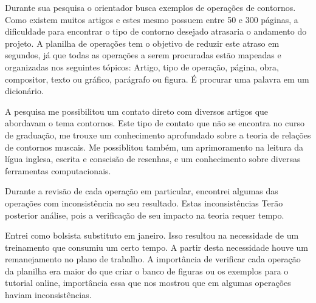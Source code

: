 \documentclass[11pt]{article}
\begin{document}
Durante sua pesquisa o orientador busca exemplos de operações de contornos. Como existem
muitos artigos e estes mesmo possuem entre 50 e 300 páginas, a dificuldade para encontrar
o tipo de contorno desejado atrasaria o andamento do projeto. A planilha de operações tem o
objetivo de reduzir este atraso em segundos, já que todas as operações a serem procuradas
estão mapeadas e organizadas nos seguintes tópicos: Artigo, tipo de operação, página, obra,
compositor, texto ou gráfico, parágrafo ou figura. É procurar uma palavra em um dicionário.

A pesquisa me possibilitou um contato direto com diversos artigos que abordavam
o tema contornos. Este tipo de contato que não se encontra no curso de graduação,
me trouxe um conhecimento aprofundado sobre a teoria de relações de contornos muscais.
Me possiblitou também, um aprimoramento na leitura da lígua inglesa, escrita e conscisão
de resenhas, e um conhecimento sobre diversas ferramentas computacionais.

Durante a revisão de cada operação em particular, encontrei algumas
das operações com inconsistência no seu resultado. Estas inconsistências 
Terão posterior análise, pois a verificação de seu impacto na teoria 
requer tempo.


Entrei como bolsista substituto em janeiro. Isso resultou na necessidade
de um treinamento que consumiu um certo tempo. A partir desta necessidade 
houve um remanejamento no plano de trabalho. A importância de verificar cada operação 
da planilha era maior do que criar o banco de figuras ou os exemplos para o 
tutorial online, importância essa que nos mostrou que em algumas operações 
haviam inconsistências.
\end{document}

